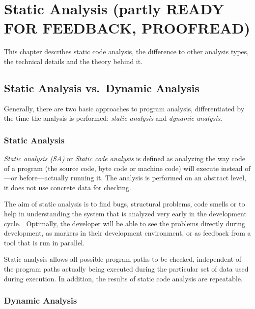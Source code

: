 \chapter{Static Analysis (partly READY FOR FEEDBACK, PROOFREAD)}
\label{static-analysis}

This chapter describes static code analysis, the difference to other analysis types, the technical details and the theory behind it.

\section{Static Analysis vs.~Dynamic Analysis}

Generally, there are two basic approaches to program analysis, differentiated by the time the analysis is performed: \emph{static analysis} and \emph{dynamic analysis}.

\subsection{Static Analysis}

\emph{Static analysis (SA)} or \emph{Static code analysis} is defined as analyzing the way code of a program (the source code, byte code or machine code) will execute instead of---or before---actually running it. The analysis is performed on an abstract level, \ie it does not use concrete data for checking.~\cite{static-code-analysis}

The aim of static analysis is to find bugs, structural problems, code smells or to help in understanding the system that is analyzed very early in the development cycle.~\cite{data-flow-analysis, chess-west} Optimally, the developer will be able to see the problems directly during development, \eg as markers in their development environment, or as feedback from a tool that is run in parallel.

Static analysis allows all possible program paths to be checked, independent of the program paths actually being executed during the particular set of data used during execution. In addition, the results of static code analysis are repeatable.~\cite{coverity-report}

\subsection{Dynamic Analysis}

